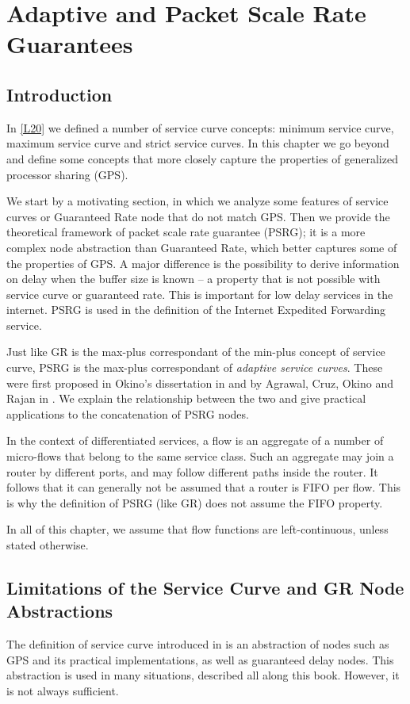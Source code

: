 \chapter{Adaptive and Packet Scale Rate Guarantees}

\section{Introduction}
In \cref{L20} we defined a number of service curve concepts:
minimum service curve, maximum service curve and strict service
curves. In this chapter we go beyond and define some concepts that
more closely capture the properties of generalized processor
sharing (GPS).

We start by a motivating section, in which we analyze some
features of service curves or Guaranteed Rate node that do not
match GPS. Then we provide the theoretical framework of packet
scale rate guarantee (PSRG); it is a more complex node
abstraction than Guaranteed Rate, which better captures some
of the properties of GPS. A major difference is the
possibility to derive information on delay when the buffer
size is known -- a property that is not possible with service
curve or guaranteed rate. This is important for low delay
services in the internet. PSRG is used in the definition of
the Internet Expedited Forwarding service.

Just like GR is the max-plus correspondant of the min-plus
concept of service curve, PSRG is the max-plus correspondant
of \emph{adaptive service curves}. These were first proposed
in Okino's dissertation in \cite{oki98} and by Agrawal, Cruz,
Okino and Rajan in \cite{cruzADAP}. We explain the
relationship between the two and give practical applications
to the concatenation of PSRG nodes.


In the context of differentiated services, a flow is an
aggregate of a number of micro-flows that belong to the same
service class. Such an aggregate may join a router by
different ports, and may follow different paths inside the
router. It follows that it can generally not be assumed that a
router is FIFO per flow. This is why the definition of PSRG
(like GR) does not assume the FIFO property.

In all of this chapter, we assume that flow functions are
left-continuous, unless stated otherwise.


\section{Limitations of the Service Curve and GR  Node
Abstractions}  The definition of
service curve introduced in  is an
abstraction of nodes such as GPS and its practical
implementations, as well as guaranteed delay nodes. This
abstraction is used in many situations, described all along
this book. However, it is not always sufficient.

